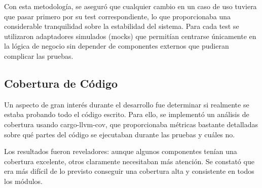 Con esta metodología, se aseguró que cualquier cambio en un caso de uso tuviera que pasar primero por su test correspondiente, lo que proporcionaba una considerable tranquilidad sobre la estabilidad del sistema. Para cada test se utilizaron adaptadores simulados (mocks) que permitían centrarse únicamente en la lógica de negocio sin depender de componentes externos que pudieran complicar las pruebas.

\newpage
\subsection{Cobertura de Código}

Un aspecto de gran interés durante el desarrollo fue determinar si realmente se estaba probando todo el código escrito. Para ello, se implementó un análisis de cobertura usando cargo-llvm-cov, que proporcionaba métricas bastante detalladas sobre qué partes del código se ejecutaban durante las pruebas y cuáles no.

Los resultados fueron reveladores: aunque algunos componentes tenían una cobertura excelente, otros claramente necesitaban más atención. Se constató que era más difícil de lo previsto conseguir una cobertura alta y consistente en todos los módulos.

\begin{table}[ht]
    \centering
    \small
    \caption{Métricas de cobertura de código por componente}
    \label{tab:code_coverage_metrics}
\end{table}

